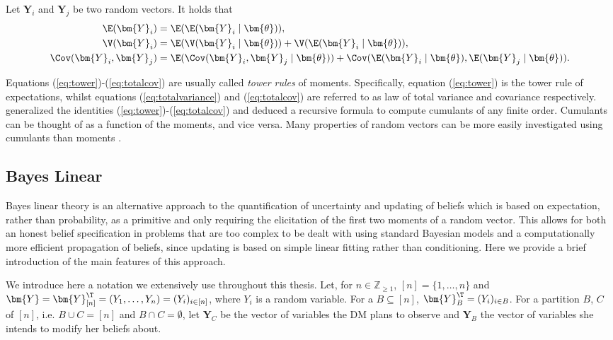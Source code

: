\begin{proposition}
\label{prop:towerrules}
Let $\bm{Y}_i$ and $\bm{Y}_j$ be two random vectors. It holds that
\begin{align}
\E(\bm{Y}_i)&=\E(\E(\bm{Y}_i\;|\;\bm{\theta})),\label{eq:tower}\\
\V(\bm{Y}_i)&=\E(\V(\bm{Y}_i\;|\;\bm{\theta}))+\V(\E(\bm{Y}_i\;|\;\bm{\theta})),\label{eq:totalvariance}\\
\Cov(\bm{Y}_i,\bm{Y}_j)&=\E(\Cov(\bm{Y}_i,\bm{Y}_j\;|\;\bm{\theta}))+\Cov(\E(\bm{Y}_i\;|\;\bm{\theta}),\E(\bm{Y}_j\;|\;\bm{\theta}))\label{eq:totalcov}.
\end{align}
\end{proposition}
Equations (\ref{eq:tower})-(\ref{eq:totalcov}) are usually called \textit{tower rules} of moments. Specifically, equation (\ref{eq:tower}) is the tower rule of expectations, whilst equations (\ref{eq:totalvariance}) and (\ref{eq:totalcov}) are referred to as law of total variance and covariance respectively.
 \citet{Brillinger1969} generalized the identities (\ref{eq:tower})-(\ref{eq:totalcov}) and deduced a recursive formula to compute cumulants of any finite order. Cumulants can be thought of as a function of the moments, and vice versa. Many properties of random vectors can be more easily investigated using cumulants than moments \citep[see e.g.][]{Zwiernik2012}.
 
\subsection{Bayes Linear}
\label{sec:bayeslinear}
Bayes linear theory \citep{Goldstein2007} is an alternative approach to the quantification of uncertainty and updating of beliefs which is based on expectation, rather than probability, as a primitive and only requiring the elicitation of the first two moments of a random vector. This allows for both an honest belief specification in problems that are too complex to be dealt with  using standard Bayesian models and a computationally more efficient propagation of beliefs, since updating is based on simple linear fitting rather than conditioning. Here we provide a brief introduction of the main features of this approach.

We introduce here a notation we  extensively use throughout this thesis. Let, for $n\in\mathbb{Z}_{\geq 1}$, $[n]=\{1,\dots,n\}$ and $\bm{Y}=\bm{Y}_{[n]}^\T=(Y_1,\dots,Y_n)=(Y_i)_{i\in[n]}$, where $Y_i$ is a random variable. For a $B\subseteq[n]$, $\bm{Y}^\T_{B}=(Y_i)_{i\in B}$. For a partition $B$, $C$ of $[n]$, i.e. $B\cup C=[n]$ and $B\cap C=\emptyset$, let $\bm{Y}_C$ be the vector of variables the \gls{DM} plans to observe and $\bm{Y}_B$ the vector of variables she intends to modify her beliefs about.

